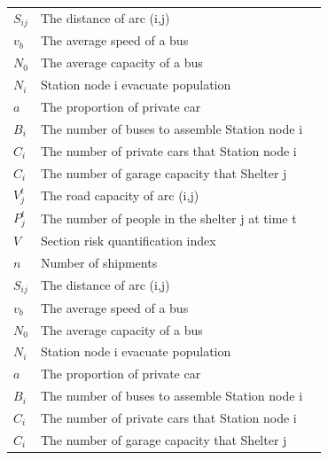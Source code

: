 \documentclass{mcmthesis}
\begin{document}
\begin{center}
\begin{longtable}{p{}p{}m{}}
$S_{ij}$       & The distance of arc (i,j)                                                \\
$v_b$       & The average speed of a bus                                                \\
$N_0$       & The average capacity of a bus                                             \\
$N_i$       & Station node i evacuate population                                        \\
$a$       & The proportion of private car                                           \\
$B_i$       & The number of buses to assemble Station node i                            \\
$C_i$       & The number of private cars that Station node i                            \\
$C_i$        & The number of garage capacity that Shelter j                             \\
$V_j^t$       & The road capacity of arc (i,j)                                            \\
$P_j^t$       & The number of people in the shelter j at time t                          \\
$V$       & Section risk quantification index                                         \\
$n$       & Number of shipments                                                     \\
$S_{ij}$       & The distance of arc (i,j)                                                \\
$v_b$       & The average speed of a bus                                                \\
$N_0$       & The average capacity of a bus                                             \\
$N_i$       & Station node i evacuate population                                        \\
$a$       & The proportion of private car                                           \\
$B_i$       & The number of buses to assemble Station node i                            \\
$C_i$       & The number of private cars that Station node i                            \\
$C_i$        & The number of garage capacity that Shelter j                             \\

\end{longtable}
\end{center}
\end{document}
